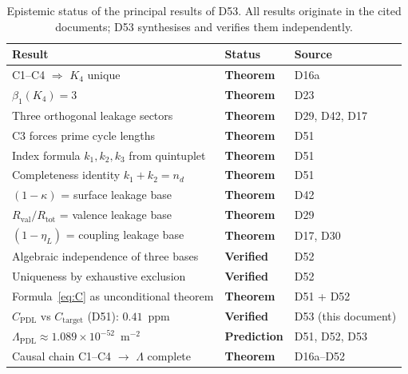 \documentclass[12pt,a4paper]{article}
\theoremstyle{plain}
\theoremstyle{definition}
\theoremstyle{remark}
\newcommand{\Kfour}{K_4}
\newcommand{\Rtot}{R_{\mathrm{tot}}}
\newcommand{\Rval}{R_{\mathrm{val}}}
\newcommand{\kap}{\kappa}
\newcommand{\etaL}{\eta_L}
\newcommand{\Lam}{\Lambda}
\begin{document}
\begin{table}[H]
\centering
\caption{Epistemic status of the principal results of D53. All results originate in the cited documents; D53 synthesises and verifies them independently.}
\label{tab:epistemic}
\renewcommand{\arraystretch}{1.3}
\begin{tabular}{p{8.0cm}p{2.5cm}p{4.0cm}}
\toprule
Result & Status & Source \\
\midrule
C1--C4 $\Rightarrow$ $\Kfour$ unique & \textcolor{proofblue}{\textbf{Theorem}} & D16a \\
$\beta_1(\Kfour) = 3$ & \textcolor{proofblue}{\textbf{Theorem}} & D23 \\
Three orthogonal leakage sectors & \textcolor{proofblue}{\textbf{Theorem}} & D29, D42, D17 \\
C3 forces prime cycle lengths & \textcolor{proofblue}{\textbf{Theorem}} & D51 \\
Index formula $k_1, k_2, k_3$ from quintuplet & \textcolor{proofblue}{\textbf{Theorem}} & D51 \\
Completeness identity $k_1 + k_2 = n_d$ & \textcolor{proofblue}{\textbf{Theorem}} & D51 \\
$(1-\kap)$ = surface leakage base & \textcolor{proofblue}{\textbf{Theorem}} & D42 \\
$\Rval/\Rtot$ = valence leakage base & \textcolor{proofblue}{\textbf{Theorem}} & D29 \\
$(1-\etaL)$ = coupling leakage base & \textcolor{proofblue}{\textbf{Theorem}} & D17, D30 \\
Algebraic independence of three bases & \textcolor{proofblue}{\textbf{Verified}} & D52 \\
Uniqueness by exhaustive exclusion & \textcolor{proofblue}{\textbf{Verified}} & D52 \\
\midrule
Formula~\eqref{eq:C} as unconditional theorem & \textcolor{proofblue}{\textbf{Theorem}} & D51 + D52 \\
$C_{\mathrm{PDL}}$ vs $C_{\mathrm{target}}$ (D51): $0.41$~ppm & \textcolor{proofblue}{\textbf{Verified}} & D53 (this document) \\
$\Lam_{\mathrm{PDL}} \approx 1.089 \times 10^{-52}$~m$^{-2}$ & \textcolor{proofblue}{\textbf{Prediction}} & D51, D52, D53 \\
\midrule
Causal chain C1--C4 $\to$ $\Lam$ complete & \textcolor{proofblue}{\textbf{Theorem}} & D16a--D52 \\
\bottomrule
\end{tabular}
\end{table}
\end{document}
